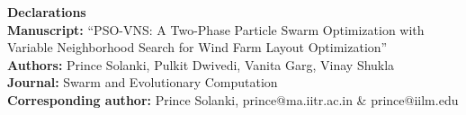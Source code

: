 \documentclass[11pt,a4paper]{article}
\begin{document}
{\large\textbf{Declarations}}\\[0.3em]
\textbf{Manuscript:} ``PSO-VNS: A Two-Phase Particle Swarm Optimization with Variable Neighborhood Search for Wind Farm Layout Optimization''\\
\textbf{Authors:} Prince Solanki, Pulkit Dwivedi, Vanita Garg, Vinay Shukla\\
\textbf{Journal:} Swarm and Evolutionary Computation\\
\textbf{Corresponding author:} Prince Solanki, prince@ma.iitr.ac.in \& prince@iilm.edu


\end{document}
